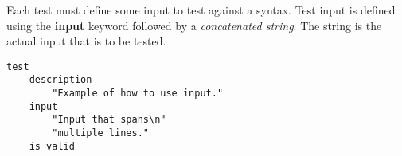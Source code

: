 

Each test must define some input to test against a syntax. 
Test input is defined using the  \textbf{input} keyword followed by a 
\textit{concatenated string}. The string is the actual input that is to be 
tested.

\begin{lstlisting}[style = SrtL]
test
    description
        "Example of how to use input."
    input 
        "Input that spans\n"
        "multiple lines."
    is valid
\end{lstlisting}